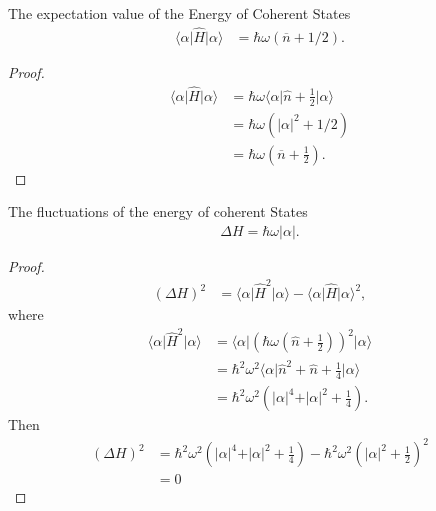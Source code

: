 \documentclass[../../note.tex]{subfiles}
\begin{document}
\begin{lemma}
    The expectation value of the Energy of Coherent States
    \begin{align}
        \langle \alpha \vert \hat{H} \vert \alpha \rangle
        &= \hbar \omega (\overline{n} + 1/2).
    \end{align}
\end{lemma}
\begin{proof}
    \begin{align}
        \langle \alpha \vert \hat{H} \vert \alpha \rangle
        &= \hbar \omega \langle \alpha \vert \hat{n} + \frac{1}{2} \vert \alpha \rangle \\
        &= \hbar \omega\left(\vert \alpha \vert^2 + 1/2 \right) \\
        &= \hbar \omega \left(\overline{n} + \frac{1}{2}\right).
    \end{align}
\end{proof}

\begin{lemma}
    The fluctuations of the energy of coherent States
    \begin{align}
        \Delta H = \hbar \omega \vert \alpha \vert.
    \end{align}
\end{lemma}
\begin{proof}
    \begin{align}
        (\Delta H)^2
        &= \langle \alpha \vert \hat{H}^2 \vert \alpha \rangle - \langle \alpha \vert \hat{H} \vert \alpha \rangle^2,
    \end{align}
    where 
    \begin{align}
        \langle \alpha \vert \hat{H}^2 \vert \alpha \rangle
        &= \langle \alpha \vert (\hbar \omega(\hat{n} + \frac{1}{2}))^2 \vert \alpha \rangle \\
        &= \hbar^2 \omega^2 \langle \alpha \vert \hat{n}^2 + \hat{n} + \frac{1}{4} \vert \alpha \rangle \\
        &= \hbar^2 \omega^2 \left(\vert \alpha \vert^4 + \vert \alpha \vert^2 + \frac{1}{4} \right).
    \end{align}
    Then 
    \begin{align}
        (\Delta H)^2
        &=\hbar^2 \omega^2\left(\vert \alpha \vert^4 + \vert \alpha \vert^2 + \frac{1}{4}\right) - \hbar^2 \omega^2 \left(\vert \alpha \vert^2 +\frac{1}{2}\right)^2 \\
        &= 0
    \end{align}
\end{proof}
\end{document}
